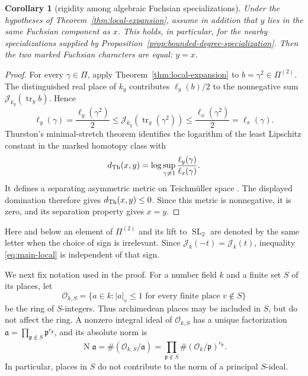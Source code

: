 \documentclass[11pt,reqno]{amsart}
\newtheorem{corollary}[theorem]{Corollary}
\theoremstyle{definition}
\theoremstyle{remark}
\newcommand{\cO}{\mathcal O}
\newcommand{\cJ}{\mathcal J}
\newcommand{\Tr}{\operatorname{tr}}
\newcommand{\SL}{\operatorname{SL}}
\newcommand{\Norm}{\operatorname{N}}
\begin{document}
\begin{corollary}[rigidity among algebraic Fuchsian specializations]
\label{cor:specialization-rigidity}
Under the hypotheses of Theorem~\ref{thm:local-expansion}, assume in addition
that \(y\) lies in the same Fuchsian component as \(x\).  This holds, in
particular, for the nearby specializations supplied by
Proposition~\ref{prop:bounded-degree-specialization}.  Then the two marked
Fuchsian characters are equal: \(y=x\).
\end{corollary}

\begin{proof}
For every \(\gamma\in\Pi\), apply Theorem~\ref{thm:local-expansion} to
\(b=\gamma^2\in\Pi^{(2)}\).  The distinguished real place of \(k_y\)
contributes \(\ell_y(b)/2\) to the nonnegative sum
\(\cJ_{k_y}(\Tr_y b)\).  Hence
\[
 \ell_y(\gamma)
 =\frac{\ell_y(\gamma^2)}2
 \le \cJ_{k_y}(\Tr_y(\gamma^2))
 \le\frac{\ell_x(\gamma^2)}2
 =\ell_x(\gamma).
\]
Thurston's minimal-stretch theorem identifies the logarithm of the least
Lipschitz constant in the marked homotopy class with
\[
 d_{\rm Th}(x,y)
 =\log\sup_{\gamma\ne1}\frac{\ell_y(\gamma)}{\ell_x(\gamma)}.
\]
It defines a separating asymmetric metric on Teichm\"uller space
\cite[Proposition~2.1 and Theorem~8.5]{ThurstonStretch}.
The displayed domination therefore gives
\(d_{\rm Th}(x,y)\le0\).  Since this metric is nonnegative, it is zero, and
its separation property gives \(x=y\).
\end{proof}

Here and below an element of \(\Pi^{(2)}\) and its lift to \(\SL_2\) are
denoted by the same letter when the choice of sign is irrelevant.  Since
\(\cJ_k(-t)=\cJ_k(t)\), inequality \eqref{eq:main-local} is independent of
that sign.

We next fix notation used in the proof.  For a
number field \(k\) and a finite set \(S\) of its places, let
\begin{equation}\label{eq:S-integer-definition}
 \cO_{k,S}=\{a\in k: |a|_v\le 1
       \text{ for every finite place }v\notin S\}
\end{equation}
be the ring of \(S\)-integers.  Thus archimedean places may be included in
\(S\), but do not affect the ring.  A nonzero integral ideal of
\(\cO_{k,S}\) has a unique factorization
\(\mathfrak a=\prod_{\mathfrak p\notin S}\mathfrak p^{e_{\mathfrak p}}\),
and its absolute norm is
\begin{equation}\label{eq:ideal-norm-definition}
 \Norm\mathfrak a
 =\#(\cO_{k,S}/\mathfrak a)
 =\prod_{\mathfrak p\notin S}
   \#(\cO_k/\mathfrak p)^{e_{\mathfrak p}}.
\end{equation}
In particular, places in \(S\) do not contribute to the norm of a principal
\(S\)-ideal.
\end{document}
